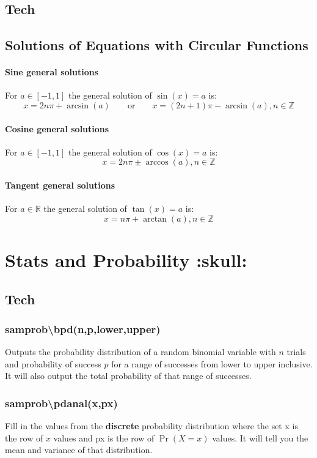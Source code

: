 \documentclass[a4paper,twoside]{article}
\begin{document}
		\subsection{Tech}
			
		\subsection{Solutions of Equations with Circular Functions}
			\paragraph{Sine general solutions} For $a\in[-1,1]$ the general solution of $\sin(x)=a$ is:
			\[
				x=2n\pi+\arcsin(a)\qquad\text{or}\qquad x=(2n+1)\pi-\arcsin(a),n\in\mathbb{Z}
			\]
			\paragraph{Cosine general solutions} For $a\in[-1,1]$ the general solution of $\cos(x)=a$ is:
			\[
				x=2n\pi\pm\arccos(a),n\in\mathbb{Z}
			\]
			\paragraph{Tangent general solutions} For $a\in\mathbb{R}$ the general solution of $\tan(x)=a$ is:
			\[
				x=n\pi+\arctan(a),n\in\mathbb{Z}
			\]
	\section{Stats and Probability :skull:}
		\subsection{Tech}
			\subsubsection{sam\textunderscore prob\textbackslash bpd(n,p,lower,upper)} Outputs the probability distribution of a random binomial variable with $n$ trials and probability of success $p$ for a range of successes from lower to upper inclusive. It will also output the total probability of that range of successes.
			\subsubsection{sam\textunderscore prob\textbackslash pdanal({x},{px})}
			Fill in the values from the \textbf{discrete} probability distribution where the set {x} is the row of $x$ values and {px} is the row of $\Pr(X=x)$ values. It will tell you the mean and variance of that distribution.
\end{document}
